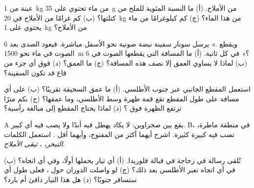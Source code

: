 \begin{exercise}[$\star\star$]\label{exo:g8:the-oceans:5}
عينة من \qty{1}{kg} من ماء  تحتوي على \qty{35}{g} من الأملاح. (أ)
ما النسبة المئوية للملح من كتلتها؟ (ب) كم غرامًا من الأملاح في
\qty{20}{kg} من هذا الماء؟ (ج) كم كيلوغرامًا من ماء  يحتوي على
\qty{1}{kg} من الأملاح؟
\end{exercise}

\begin{exercise}[$\star\star$]\label{exo:g8:the-oceans:6}
يرسل سونار سفينة نبضة صوتية نحو الأسفل مباشرة. فيعود الصدى بعد
\qty{6}{s}. ويقطع الصوت في ماء  نحو \qty{1500}{m} في كل ثانية. (أ) ما
المسافة التي يقطعها الصوت في \qty{6}{s}؟ (ب) لماذا لا يساوي العمق إلا نصف
هذه المسافة؟ (ج) ما العمق؟ (د) فوق أي جزء من قاع  قد تكون
السفينة؟
\end{exercise}

\begin{exercise}[$\star\star$]\label{exo:g8:the-oceans:7}
استعمل المقطع الجانبي عبر جنوب الأطلسي. (أ) ما عمق  السحيقة تقريبًا؟
(ب) على أي مسافة على طول المقطع تقع قمة ظهرة وسط الأطلسي، وما عمقها؟
(ج) بكم مترًا ترتفع الظهرة فوق ؟ (د) لماذا يحتاج المقطع إلى مبالغة
رأسية؟
\end{exercise}

\begin{exercise}[$\star\star$]\label{exo:g8:the-oceans:8}
 A يقع بين صحراوين: لا يكاد  يهطل فيه أبدًا ولا يصب فيه أي 
كبير.  B، في منطقة ماطرة، تصب فيه  كبيرة كثيرة. اشرح أيهما أكثر
 من  المفتوح، وأيهما أقل . استعمل الكلمات \emph{التبخر}،
\emph{}، \emph{تبقى الأملاح}.
\end{exercise}

\begin{exercise}[$\star\star$]\label{exo:g8:the-oceans:9}
تُلقى رسالة في زجاجة في  قبالة  فلوريدا. (أ) أي تيار يحملها أولًا،
وفي أي اتجاه؟ (ب) في أي اتجاه تعبر الأطلسي بعد ذلك؟ (ج) لو واصلت الدوران
حول ، فعلى طول أي  ستسافر جنوبًا؟ (د) هل هذا التيار دافئ أم
بارد؟
\end{exercise}

